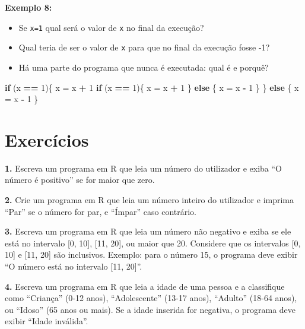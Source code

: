 \documentclass[
]{book}
\newenvironment{Shaded}{\begin{snugshade}}{\end{snugshade}}
\newcommand{\ControlFlowTok}[1]{\textcolor[rgb]{0.13,0.29,0.53}{\textbf{#1}}}
\newcommand{\DecValTok}[1]{\textcolor[rgb]{0.00,0.00,0.81}{#1}}
\newcommand{\NormalTok}[1]{#1}
\newcommand{\OtherTok}[1]{\textcolor[rgb]{0.56,0.35,0.01}{#1}}
\newcommand{\SpecialCharTok}[1]{\textcolor[rgb]{0.81,0.36,0.00}{\textbf{#1}}}
\begin{document}
\textbf{Exemplo 8:}

\begin{itemize}
\item
  Se \texttt{x=1} qual será o valor de \texttt{x} no final da execução?
\item
  Qual teria de ser o valor de \texttt{x} para que no final da execução fosse
  -1?
\item
  Há uma parte do programa que nunca é executada: qual é e porquê?
\end{itemize}

\begin{Shaded}
\begin{Highlighting}[]
\ControlFlowTok{if}\NormalTok{ (x }\SpecialCharTok{==} \DecValTok{1}\NormalTok{)\{  }
\NormalTok{  x }\OtherTok{=}\NormalTok{ x }\SpecialCharTok{+} \DecValTok{1}  
  \ControlFlowTok{if}\NormalTok{ (x }\SpecialCharTok{==} \DecValTok{1}\NormalTok{)\{    }
\NormalTok{    x }\OtherTok{=}\NormalTok{ x }\SpecialCharTok{+} \DecValTok{1}  
\NormalTok{  \} }\ControlFlowTok{else}\NormalTok{ \{   }
\NormalTok{      x }\OtherTok{=}\NormalTok{ x }\SpecialCharTok{{-}} \DecValTok{1}  
\NormalTok{  \}}
\NormalTok{\} }\ControlFlowTok{else}\NormalTok{ \{  }
\NormalTok{    x }\OtherTok{=}\NormalTok{ x }\SpecialCharTok{{-}} \DecValTok{1}
\NormalTok{\}}
\end{Highlighting}
\end{Shaded}

\section{Exercícios}\label{exercuxedcios-6}

\textbf{1.} Escreva um programa em R que leia um número do utilizador e exiba
``O número é positivo'' se for maior que zero.

\textbf{2.} Crie um programa em R que leia um número inteiro do utilizador e
imprima ``Par'' se o número for par, e ``Ímpar'' caso contrário.

\textbf{3.} Escreva um programa em R que leia um número não negativo e exiba se ele está
no intervalo {[}0, 10{]}, {[}11, 20{]}, ou maior que 20. Considere que os
intervalos {[}0, 10{]} e {[}11, 20{]} são inclusivos. Exemplo: para o número 15,
o programa deve exibir ``O número está no intervalo {[}11, 20{]}''.

\textbf{4.} Escreva um programa em R que leia a idade de uma pessoa e a
classifique como ``Criança'' (0-12 anos), ``Adolescente'' (13-17 anos),
``Adulto'' (18-64 anos), ou ``Idoso'' (65 anos ou mais). Se a idade inserida
for negativa, o programa deve exibir ``Idade inválida''.
\end{document}
